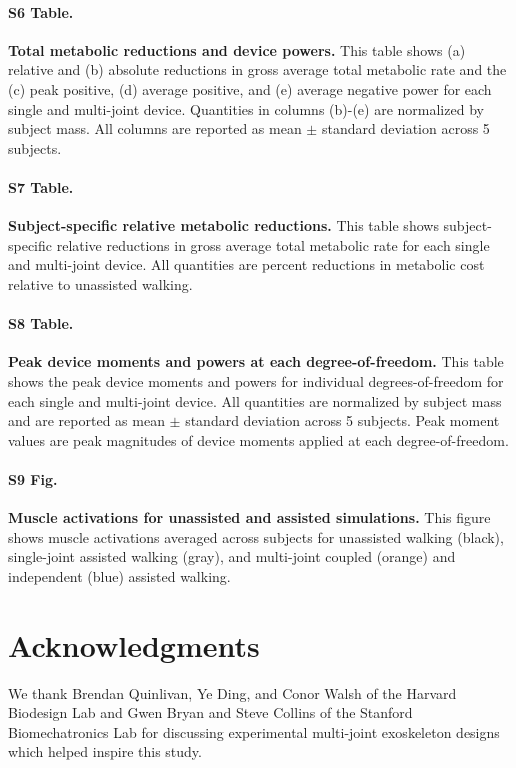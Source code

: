\documentclass[10pt,letterpaper]{article}
\begin{document}
\paragraph*{S6 Table.}
\label{S6_Table}
{\bf Total metabolic reductions and device powers.} This table shows (a) relative and (b) absolute reductions in gross average total metabolic rate and the (c) peak positive, (d) average positive, and (e) average negative power for each single and multi-joint device. Quantities in columns (b)-(e) are normalized by subject mass. All columns are reported as mean $\pm$ standard deviation across 5 subjects.

\paragraph*{S7 Table.}
\label{S7_Table}
{\bf Subject-specific relative metabolic reductions.} This table shows subject-specific relative reductions in gross average total metabolic rate for each single and multi-joint device. All quantities are percent reductions in metabolic cost relative to unassisted walking. 

\paragraph*{S8 Table.}
\label{S8_Table}
{\bf Peak device moments and powers at each degree-of-freedom.} This table shows the peak device moments and powers for individual degrees-of-freedom for each single and multi-joint device. All quantities are normalized by subject mass and are reported as mean $\pm$ standard deviation across 5 subjects. Peak moment values are peak magnitudes of device moments applied at each degree-of-freedom.

\paragraph*{S9 Fig.}
\label{S9_Fig}
{\bf Muscle activations for unassisted and assisted simulations.} This figure shows muscle activations averaged across subjects for unassisted walking (black), single-joint assisted walking (gray), and multi-joint coupled (orange) and independent (blue) assisted walking.

\section*{Acknowledgments}
We thank Brendan Quinlivan, Ye Ding, and Conor Walsh of the Harvard Biodesign Lab and Gwen Bryan and Steve Collins of the Stanford Biomechatronics Lab for discussing experimental multi-joint exoskeleton designs which helped inspire this study. 
\end{document}
